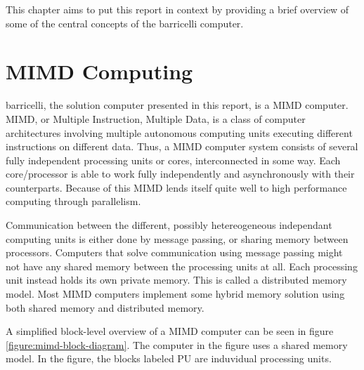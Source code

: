 This chapter aims to put this report in context by providing a brief overview of some of the central concepts of the \Gls{barricelli} computer.

\section{MIMD Computing}

\Gls{barricelli}, the solution computer presented in this report, is a \Gls{MIMD} computer. \Gls{MIMD}, or Multiple Instruction, Multiple Data, is a class of computer architectures involving multiple autonomous computing units executing different instructions on different data.
Thus, a MIMD computer system consists of several fully independent processing units or cores, interconnected in some way.
Each core/processor is able to work fully independently and asynchronously with their counterparts.
Because of this MIMD lends itself quite well to high performance computing through parallelism.

Communication between the different, possibly hetereogeneous independant computing units is either done by message passing, or sharing memory between processors.
Computers that solve communication using message passing might not have any shared memory between the processing units at all.
Each processing unit instead holds its own private memory.
This is called a distributed memory model.
Most MIMD computers implement some hybrid memory solution using both shared memory and distributed memory.

A simplified block-level overview of a MIMD computer can be seen in figure \vref{figure:mimd-block-diagram}.
The computer in the figure uses a shared memory model.
In the figure, the blocks labeled PU are induvidual processing units.


